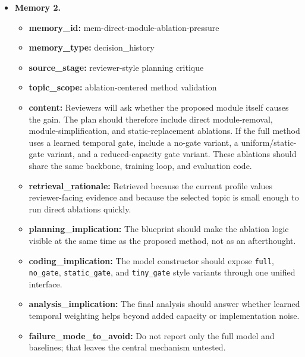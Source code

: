 \documentclass{opendatalab}
\begin{document}
\begin{tcolorbox}
\begin{itemize}
  \item \textbf{Memory 2.}
  \begin{itemize}\setlength\itemsep{1pt}
    \item \textbf{memory\_id:} mem-direct-module-ablation-pressure
    \item \textbf{memory\_type:} decision\_history
    \item \textbf{source\_stage:} reviewer-style planning critique
    \item \textbf{topic\_scope:} ablation-centered method validation
    \item \textbf{content:} Reviewers will ask whether the proposed module itself causes the gain. The plan should therefore include direct module-removal, module-simplification, and static-replacement ablations. If the full method uses a learned temporal gate, include a no-gate variant, a uniform/static-gate variant, and a reduced-capacity gate variant. These ablations should share the same backbone, training loop, and evaluation code.
    \item \textbf{retrieval\_rationale:} Retrieved because the current profile values reviewer-facing evidence and because the selected topic is small enough to run direct ablations quickly.
    \item \textbf{planning\_implication:} The blueprint should make the ablation logic visible at the same time as the proposed method, not as an afterthought.
    \item \textbf{coding\_implication:} The model constructor should expose \texttt{full}, \texttt{no\_gate}, \texttt{static\_gate}, and \texttt{tiny\_gate} style variants through one unified interface.
    \item \textbf{analysis\_implication:} The final analysis should answer whether learned temporal weighting helps beyond added capacity or implementation noise.
    \item \textbf{failure\_mode\_to\_avoid:} Do not report only the full model and baselines; that leaves the central mechanism untested.
  \end{itemize}


\end{itemize}
\end{tcolorbox}
\end{document}

